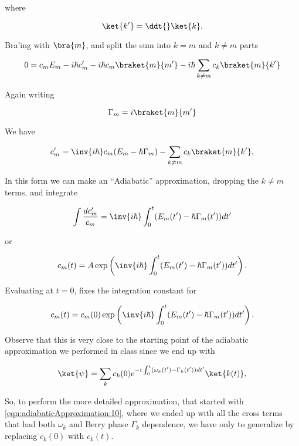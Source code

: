 where

\begin{equation}\label{eqn:adiabaticApproximation:70}
\ket{k'} = \ddt{} \ket{k}.
\end{equation}

Bra'ing with $\bra{m}$, and split the sum into $k = m$ and $k \ne m$ parts

\begin{equation}\label{eqn:adiabaticApproximation:90}
0 =
c_m E_m - i \hbar c_m' 
- i \hbar c_m \braket{m}{m'} 
- i \hbar \sum_{k \ne m} c_k \braket{m}{k'} 
\end{equation}

Again writing

\begin{equation}\label{eqn:adiabaticApproximation:110}
\Gamma_m = i \braket{m}{m'} 
\end{equation}

We have

\begin{equation}\label{eqn:adiabaticApproximation:130}
c_m' = \inv{i \hbar} c_m (E_m - \hbar \Gamma_m) - \sum_{k \ne m} c_k \braket{m}{k'},
\end{equation}

In this form we can make an ``Adiabatic'' approximation, dropping the $k \ne m$ terms, and integrate

\begin{equation}\label{eqn:adiabaticApproximation:150}
\int \frac{d c_m'}{c_m} = \inv{i \hbar} \int_0^t (E_m(t') - \hbar \Gamma_m(t')) dt' 
\end{equation}

or

\begin{equation}\label{eqn:adiabaticApproximation:170}
c_m(t) = A \exp\left(
\inv{i \hbar} \int_0^t (E_m(t') - \hbar \Gamma_m(t')) dt' 
\right).
\end{equation}

Evaluating at $t = 0$, fixes the integration constant for

\begin{equation}\label{eqn:adiabaticApproximation:190}
c_m(t) = c_m(0) \exp\left(
\inv{i \hbar} \int_0^t (E_m(t') - \hbar \Gamma_m(t')) dt' 
\right).
\end{equation}

Observe that this is very close to the starting point of the adiabatic approximation we performed in class since we end up with

\begin{equation}\label{eqn:adiabaticApproximation:210}
\ket{\psi} = \sum_k c_k(0) e^{-i \int_0^t (\omega_k(t') - \Gamma_k(t')) dt' } \ket{k(t)},
\end{equation}

So, to perform the more detailed approximation, that started with \ref{eqn:adiabaticApproximation:10}, where we ended up with all the cross terms that had both $\omega_k$ and Berry phase $\Gamma_k$ dependence, we have only to generalize by replacing $c_k(0)$ with $c_k(t)$.

\EndNoBibArticle
